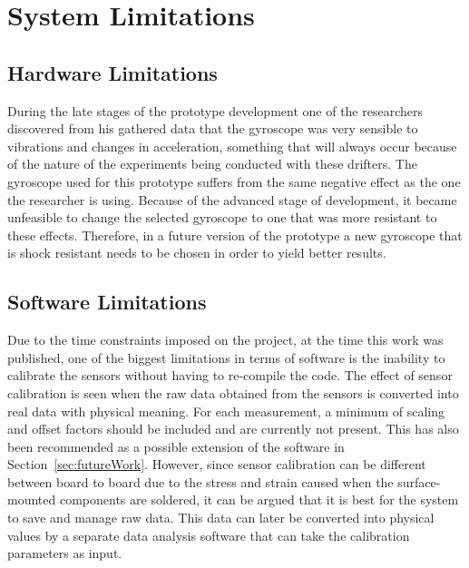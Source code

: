 \section{System Limitations}

\subsection{Hardware Limitations}
During the late stages of the prototype development one of the researchers discovered from his gathered data that the gyroscope was very sensible to vibrations and changes in acceleration, something that will always occur because of the nature of the experiments being conducted with these drifters.  The gyroscope used for this prototype suffers from the same negative effect as the one the researcher is using.  Because of the advanced stage of development, it became unfeasible to change the selected gyroscope to one that was more resistant to these effects. Therefore, in a future version of the prototype a new gyroscope that is shock resistant needs to be chosen in order to yield better results.

\subsection{Software Limitations}
Due to the time constraints imposed on the project, at the time this work was published, one of the biggest limitations in terms of software is the inability to calibrate the sensors without having to re-compile the code.  The effect of sensor calibration is seen when the raw data obtained from the sensors is converted into real data with physical meaning.  For each measurement, a minimum of scaling and offset factors should be included and are currently not present.  This has also been recommended as a possible extension of the software in Section~\ref{sec:futureWork}. However, since sensor calibration can be different between board to board due to the stress and strain caused when the surface-mounted components are soldered, it can be argued that it is best for the system to save and manage raw data.  This data can later be converted into physical values by a separate data analysis software that can take the calibration parameters as input.